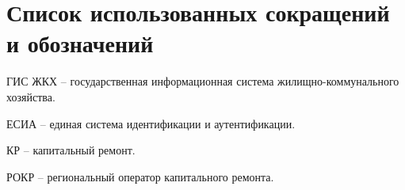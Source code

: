 \section*{Список использованных сокращений и обозначений}

ГИС ЖКХ -- государственная информационная система жи\-лищ\-но-ком\-му\-наль\-ного хозяйства.

ЕСИА -- единая система идентификации и аутентификации.

КР -- капитальный ремонт.

РОКР -- региональный оператор капитального ремонта.

\clearpage
\newpage